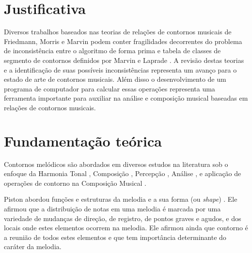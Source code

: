 \documentclass[12pt]{article}
\newcommand{\eng}[1]{\textit{#1}}
\begin{document}
\section{Justificativa}
\label{sec:justificativa}

Diversos trabalhos baseados nas teorias de relações de contornos
musicais de Friedmann, Morris e Marvin podem conter fragilidades
decorrentes do problema de inconsistência entre o algoritmo de forma
prima e tabela de classes de segmento de contornos definidos por
Marvin e Laprade \cite{marvin.ea87:relating}. A revisão destas teorias
e a identificação de suas possíveis inconsistências representa um
avanço para o estado de arte de contornos musicais. Além disso o
desenvolvimento de um programa de computador para calcular essas
operações representa uma ferramenta importante para auxiliar na
análise e composição musical baseadas em relações de contornos
musicais.

\section{Fundamentação teórica}
\label{sec:fund-teor}


Contornos melódicos são abordados em diversos estudos na literatura
sob o enfoque da Harmonia Tonal \cite{piston59:harmony}, Composição
\cite{schoenberg67:fundamentals,toch77:shaping}, Percepção
\cite{edworthy85:musical,dewitt.ea86:recognition}, Análise
\cite{adams76:melodic,friedmann85:methodology,friedmann87:response,marvin.ea87:relating,marvin88:generalized,marvin91:perception,marvin.ea95:generalization,morris87:composition,morris93:directions,morris95:compositional,clifford95:contour,beard03:contour,bor09:contour,schultz08:melodic,schultz09:diachronic},
e aplicação de operações de contorno na Composição Musical
\cite{sampaio08:em}.



Piston abordou funções e estruturas da melodia e a sua forma (ou
\eng{shape}) \cite{piston59:harmony}. Ele afirmou que a distribuição
de notas em uma melodia é marcada por uma variedade de mudanças de
direção, de registro, de pontos graves e agudos, e dos locais onde
estes elementos ocorrem na melodia. Ele afirmou ainda que contorno é a
reunião de todos estes elementos e que tem importância determinante do
caráter da melodia.
\end{document}
